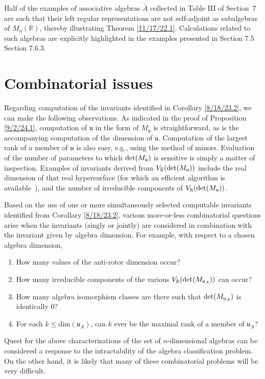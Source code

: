 \documentclass{amsart}
\theoremstyle{definition}
\numberwithin{theorem}{section}
\numberwithin{equation}{section}
\begin{document}
 Half of the examples of associative algebras $\bar{A}$ collected in Table III of \mbox{Section 7} are such that their left regular representations are not self-adjoint as subalgebras of $M_n(\mathbb{R})$, thereby illustrating Theorem \ref{11/17/22.1}.  Calculations related to such algebras are explicitly highlighted in the examples presented in Section 7.5 Section 7.6.3.


  \section{Combinatorial issues}
Regarding computation of the invariants identified in Corollary \ref{8/18/23.2}, we can make the following observations.  As indicated in the proof of Proposition \ref{9/2/24.1}, computation of $\mathfrak{u}$ in the form of $M_\mathfrak{u}$ is straightforward, as is the accompanying computation of the dimension of $\mathfrak{u}$.   Computation of the largest rank of a member of $\mathfrak{u}$ is also easy, e.g., using the method of minors.   Evaluation of the number of parameters to which ${\rm det}(M_{\mathfrak{u}})$ is sensitive is simply a matter of inspection.  Examples of invariants derived from $V_\mathbb{R}({\rm det}(M_{\mathfrak{u}}))$ include the real dimension of that real hypersurface (for which an efficient algorithm is \mbox{available \cite{bannwarth:2015})}, and the number of irreducible components of $V_\mathbb{R}({\rm det}(M_{\mathfrak{u}}))$.  

 
Based on the use of one or more simultaneously selected computable invariants identified from Corollary \ref{8/18/23.2}, various more-or-less combinatorial questions arise when the invariants (singly or jointly) are considered in combination with the invariant given by algebra dimension.  For example, with respect to a chosen algebra dimension,  


\begin{enumerate} \item How many values of the anti-rotor dimension occur?  \item How many irreducible components of the various $V_\mathbb{R}({\rm det}(M_{\mathfrak{u}_A}))$ can occur?  \item How many algebra isomorphism classes are there such that ${\rm det}(M_{\mathfrak{u}_A})$ is identically $0$?  \item For each $k\le \text{dim}(\mathfrak{u}_A)$, can $k$ ever be the maximal rank of a member of $\mathfrak{u}_A$?   \end{enumerate}  
 Quest for the above characterizations of the set of $n$-dimensional algebras can be considered a response to the intractability of the algebra classification problem.  On the other hand, it is likely that many of these combinatorial problems will be very difficult.
\end{document}
